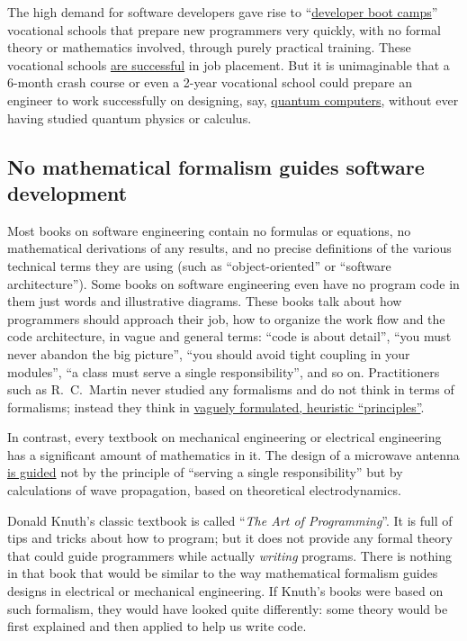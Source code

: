 The high demand for software developers gave rise to ``\href{https://cvbj.biz/2018/03/15/demand-software-developers-continues-soar-heres-cheapest-free-way-start-tech-career/}{developer boot camps}''
\textendash{} vocational schools that prepare new programmers very
quickly, with no formal theory or mathematics involved, through purely
practical training. These vocational schools \href{https://www.fullstackacademy.com/blog/why-are-some-coding-bootcamps-job-placement-rates-so-high}{are successful}
in job placement. But it is unimaginable that a 6-month crash course
or even a 2-year vocational school could prepare an engineer to work
successfully on designing, say, \href{https://www.dwavesys.com/quantum-computing}{quantum computers},
without ever having studied quantum physics or calculus.

\subsection{No mathematical formalism guides software development}

Most books on software engineering contain no formulas or equations,
no mathematical derivations of any results, and no precise definitions
of the various technical terms they are using (such as ``object-oriented''
or ``software architecture''). Some books on software engineering
even have no program code in them \textendash{} just words and illustrative
diagrams. These books talk about how programmers should approach their
job, how to organize the work flow and the code architecture, in vague
and general terms: ``code is about detail'', ``you must never abandon
the big picture'', ``you should avoid tight coupling in your modules'',
``a class must serve a single responsibility'', and so on. Practitioners
such as R.\ C.\ Martin never studied any formalisms and do not think
in terms of formalisms; instead they think in \href{https://blog.cleancoder.com/uncle-bob/2016/03/19/GivingUpOnTDD.html}{vaguely formulated, heuristic \textquotedblleft principles\textquotedblright}.

In contrast, every textbook on mechanical engineering or electrical
engineering has a significant amount of mathematics in it. The design
of a microwave antenna \href{https://www.youtube.com/watch\%3Fv\%3D46SbGxS73dY}{is guided}
not by the principle of ``serving a single responsibility'' but
by calculations of wave propagation, based on theoretical electrodynamics.

Donald Knuth's classic textbook is called ``\emph{The Art of Programming}''.
It is full of tips and tricks about how to program; but it does not
provide any formal theory that could guide programmers while actually
\emph{writing} programs. There is nothing in that book that would
be similar to the way mathematical formalism guides designs in electrical
or mechanical engineering. If Knuth's books were based on such formalism,
they would have looked quite differently: some theory would be first
explained and then applied to help us write code.

